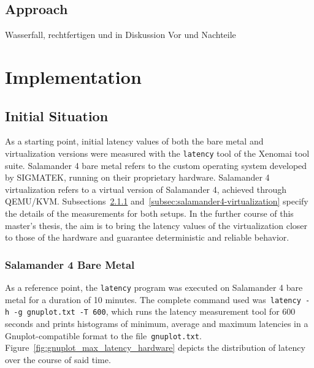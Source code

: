 \documentclass[MMR,Master,english]{twbook}
\begin{document}
\section{Approach}\label{sec:approach}
Wasserfall, rechtfertigen und in Diskussion Vor und Nachteile

\clearpage

\chapter{Implementation}

\section{Initial Situation}\label{sec:starting_situation}
As a starting point, initial latency values of both the bare metal and virtualization versions were measured with the \texttt{latency} tool of the Xenomai tool suite. Salamander 4 bare metal refers to the custom operating system developed by SIGMATEK, running on their proprietary hardware. Salamander 4 virtualization refers to a virtual version of Salamander 4, achieved through QEMU/KVM. Subsections~\ref{subsec:salamander4-bare-metal} and~\ref{subsec:salamander4-virtualization} specify the details of the measurements for both setups. In the further course of this master's thesis, the aim is to bring the latency values of the virtualization closer to those of the hardware and guarantee deterministic and reliable behavior.

\subsection{Salamander 4 Bare Metal}\label{subsec:salamander4-bare-metal}
As a reference point, the \texttt{latency} program was executed on Salamander 4 bare metal for a duration of 10 minutes. The complete command used was~\texttt{latency -h -g gnuplot.txt -T 600}, which runs the latency measurement tool for 600 seconds and prints histograms of minimum, average and maximum latencies in a Gnuplot-compatible format to the file~\texttt{gnuplot.txt}. Figure~\ref{fig:gnuplot_max_latency_hardware} depicts the distribution of latency over the course of said time.
\end{document}
